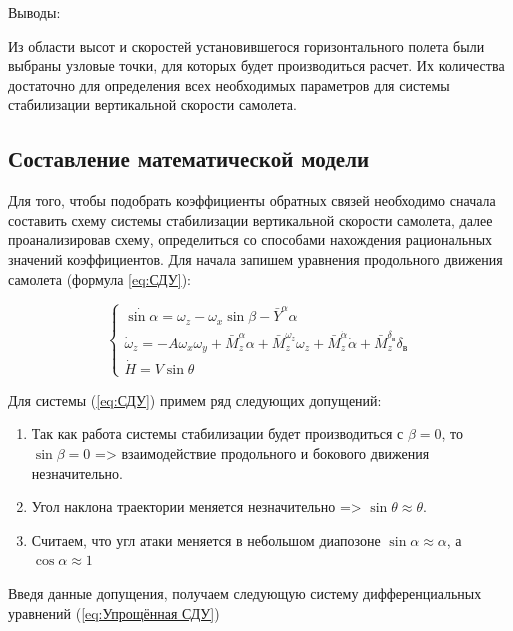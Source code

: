 \begin{center}
    Выводы:
\end{center}

Из области высот и скоростей установившегося горизонтального полета были выбраны узловые точки, для которых будет производиться расчет. Их количества достаточно для определения всех необходимых параметров для системы стабилизации вертикальной скорости самолета.

\subsection{Составление математической модели}

Для того, чтобы подобрать коэффициенты обратных связей необходимо сначала составить схему системы стабилизации вертикальной скорости самолета, далее проанализировав схему, определиться со способами нахождения рациональных значений коэффициентов. Для начала запишем уравнения продольного движения самолета (формула \ref{eq:СДУ}):

\begin{equation}
    \label{eq:СДУ}
    \begin{cases}
        \dot{\sin{\alpha}}=\omega_z-\omega_x \sin{\beta}-\bar{Y}^{\alpha} \alpha \\
        \dot{\omega}_z=-A \omega_x \omega_y+\bar{M}_z^{\alpha} \alpha+\bar{M}_z^{\omega_z} \omega_z +\bar{M}_z^{\dot{\alpha}} \dot{\alpha}+\bar{M}_z^{\delta_{\text{в}}} \delta_{\text{в}} \\
        \dot{H}=V\sin{\theta}
    \end{cases}
\end{equation}

Для системы (\ref{eq:СДУ}) примем ряд следующих допущений:
\begin{enumerate}
    \item Так как работа системы стабилизации будет производиться с $\beta=0$, то $\sin{\beta}=0$ => взаимодействие продольного и бокового движения незначительно.
    \item Угол наклона траектории меняется незначительно => $\sin{\theta} \approx \theta$.
    \item Считаем, что угл атаки меняется в небольшом диапозоне $\sin{\alpha} \approx \alpha$, а $\cos{\alpha} \approx 1$
\end{enumerate}

Введя данные допущения, получаем следующую систему дифференциальных уравнений (\ref{eq:Упрощённая СДУ})

